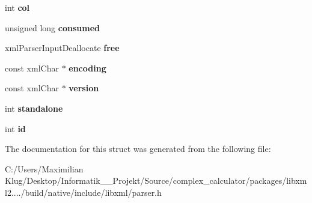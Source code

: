 \begin{DoxyCompactItemize}
int {\bfseries col}
\item 
\mbox{\label{struct__xml_parser_input_aa4dbae4bbb1c3ffa212ad5d41402e587}} 
unsigned long {\bfseries consumed}
\item 
\mbox{\label{struct__xml_parser_input_a7c55373e42c374bc9df1c542274398fa}} 
xml\+Parser\+Input\+Deallocate {\bfseries free}
\item 
\mbox{\label{struct__xml_parser_input_a5584d583c2961fad2f63fef889363cbf}} 
const xml\+Char $\ast$ {\bfseries encoding}
\item 
\mbox{\label{struct__xml_parser_input_ac15a9de83b0f6bee277164b50f0e2e41}} 
const xml\+Char $\ast$ {\bfseries version}
\item 
\mbox{\label{struct__xml_parser_input_a2799e20f843ea79b753d9f8b60d4b793}} 
int {\bfseries standalone}
\item 
\mbox{\label{struct__xml_parser_input_a20347691b442d481465e18f6777efecd}} 
int {\bfseries id}
\end{DoxyCompactItemize}


The documentation for this struct was generated from the following file\+:\begin{DoxyCompactItemize}
\item 
C\+:/\+Users/\+Maximilian Klug/\+Desktop/\+Informatik\+\_\+\_\+\+Projekt/\+Source/complex\+\_\+calculator/packages/libxml2..../build/native/include/libxml/parser.\+h\end{DoxyCompactItemize}

